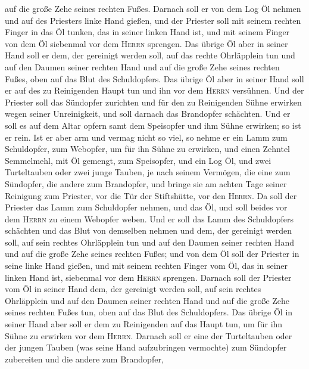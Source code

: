 auf die große Zehe seines rechten Fußes.  Darnach soll er
von dem Log Öl nehmen und auf des Priesters linke Hand gießen,
 und der Priester soll mit seinem rechten Finger in das
Öl tunken, das in seiner linken Hand ist, und mit seinem Finger von dem
Öl siebenmal vor dem \textsc{Herrn} sprengen.  Das übrige
Öl aber in seiner Hand soll er dem, der gereinigt werden soll, auf das
rechte Ohrläpplein tun und auf den Daumen seiner rechten Hand und auf
die große Zehe seines rechten Fußes, oben auf das Blut des Schuldopfers.
 Das übrige Öl aber in seiner Hand soll er auf des zu
Reinigenden Haupt tun und ihn vor dem \textsc{Herrn} versühnen.
 Und der Priester soll das Sündopfer zurichten und für
den zu Reinigenden Sühne erwirken wegen seiner Unreinigkeit, und soll
darnach das Brandopfer schächten.  Und er soll es auf dem
Altar opfern samt dem Speisopfer und ihm Sühne erwirken; so ist er rein.
 Ist er aber arm und vermag nicht so viel, so nehme er
ein Lamm zum Schuldopfer, zum Webopfer, um für ihn Sühne zu erwirken,
und einen Zehntel Semmelmehl, mit Öl gemengt, zum Speisopfer, und ein
Log Öl,  und zwei Turteltauben oder zwei junge Tauben, je
nach seinem Vermögen, die eine zum Sündopfer, die andere zum Brandopfer,
 und bringe sie am achten Tage seiner Reinigung zum
Priester, vor die Tür der Stiftshütte, vor den \textsc{Herrn}.
 Da soll der Priester das Lamm zum Schuldopfer nehmen,
und das Öl, und soll beides vor dem \textsc{Herrn} zu einem Webopfer
weben.  Und er soll das Lamm des Schuldopfers schächten
und das Blut von demselben nehmen und dem, der gereinigt werden soll,
auf sein rechtes Ohrläpplein tun und auf den Daumen seiner rechten Hand
und auf die große Zehe seines rechten Fußes;  und von dem
Öl soll der Priester in seine linke Hand gießen,  und mit
seinem rechten Finger vom Öl, das in seiner linken Hand ist, siebenmal
vor dem \textsc{Herrn} sprengen.  Darnach soll der
Priester vom Öl in seiner Hand dem, der gereinigt werden soll, auf sein
rechtes Ohrläpplein und auf den Daumen seiner rechten Hand und auf die
große Zehe seines rechten Fußes tun, oben auf das Blut des Schuldopfers.
 Das übrige Öl in seiner Hand aber soll er dem zu
Reinigenden auf das Haupt tun, um für ihn Sühne zu erwirken vor dem
\textsc{Herrn}.  Darnach soll er eine der Turteltauben
oder der jungen Tauben (was seine Hand aufzubringen vermochte)
 zum Sündopfer zubereiten und die andere zum Brandopfer,
